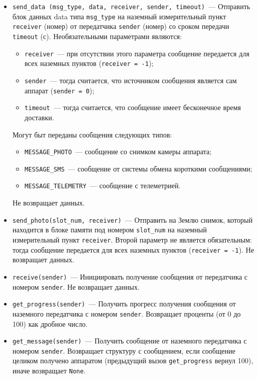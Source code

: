 \documentclass[12pt,a4paper]{article}
\begin{document}
\begin{itemize}
\item \verb'send_data (msg_type, data, receiver, sender, timeout)'~--- Отправить блок
  данных data типа \verb'msg_type' на наземный измерительный пункт \verb'receiver' (номер)
  от передатчика \verb'sender' (номер) со сроком передачи \verb'timeout' (с). Необязательными
  параметрами являются:

\begin{itemize}
\item \verb'receiver'~---  при отсутствии этого параметра сообщение передается для всех наземных пунктов (\verb'receiver = -1');
\item \verb'sender'~---  тогда считается, что источником сообщения является сам аппарат (\verb'sender = 0');
\item \verb'timeout'~---  тогда считается, что сообщение имеет бесконечное время доставки.
\end{itemize}

    Могут быт переданы сообщения следующих типов:

\begin{itemize}
\item \verb'MESSAGE_PHOTO'~---  сообщение со снимком камеры аппарата;
\item \verb'MESSAGE_SMS'~---  сообщение от системы обмена короткими сообщениями;
\item \verb'MESSAGE_TELEMETRY'~---  сообщение с телеметрией.
\end{itemize}
    
Не возвращает данных.
\item \verb'send_photo(slot_num, receiver)'~--- Отправить на Землю снимок, который
  находится в блоке памяти под номером \verb'slot_num' на наземный измерительный пункт
  \verb'receiver'. Второй параметр не является обязательным: тогда сообщение передается для всех
  наземных пунктов (\verb'receiver = -1'). Не возвращает данных.
\item \verb'receive(sender)'~--- Инициировать получение сообщения от передатчика с номером
  \verb'sender'. Не возвращает данных.
\item \verb'get_progress(sender)'~--- Получить прогресс получения сообщения от наземного
  передатчика с номером \verb'sender'. Возвращает проценты (от 0 до 100) как дробное число.
\item \verb'get_message(sender)'~--- Получить сообщение от наземного передатчика с номером
  \verb'sender'. Возвращает структуру с сообщением, если сообщение целиком получено
  аппаратом (предыдущий вызов \verb'get_progress' вернул 100), иначе возвращает
  \verb'None'.
\end{itemize}
\end{document}
